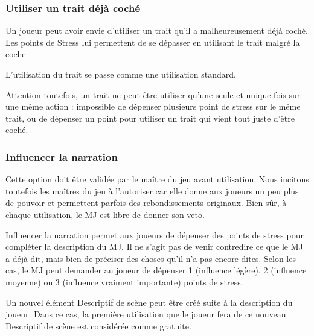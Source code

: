 \subsubsection{Utiliser un trait déjà coché}

Un joueur peut avoir envie d'utiliser un trait qu'il a malheureusement déjà coché. Les points de Stress lui permettent de se dépasser en utilisant le trait malgré la coche.

L'utilisation du trait se passe comme une utilisation standard.

Attention toutefois, un trait ne peut être utiliser qu'une seule et unique fois sur une même action : impossible de dépenser plusieurs point de stress sur le même trait, ou de dépenser un point pour utiliser un trait qui vient tout juste d'être coché.

\subsubsection{Influencer la narration}


Cette option doit être validée par le maître du jeu avant utilisation. Nous incitons toutefois les maîtres du jeu à l'autoriser car elle donne aux joueurs un peu plus de pouvoir et permettent parfois des rebondissements originaux. Bien sûr, à chaque utilisation, le MJ est libre de donner son veto.

Influencer la narration permet aux joueurs de dépenser des points de stress pour compléter la description du MJ. Il ne s'agit pas de venir contredire ce que le MJ a déjà dit, mais bien de préciser des choses qu'il n'a pas encore dites. Selon les cas, le MJ peut demander au joueur de dépenser 1 (influence légère), 2 (influence moyenne) ou 3 (influence vraiment importante) points de stress.

Un nouvel élément Descriptif de scène peut être créé suite à la description du joueur. Dans ce cas, la première utilisation que le joueur fera de ce nouveau Descriptif de scène est considérée comme gratuite.


